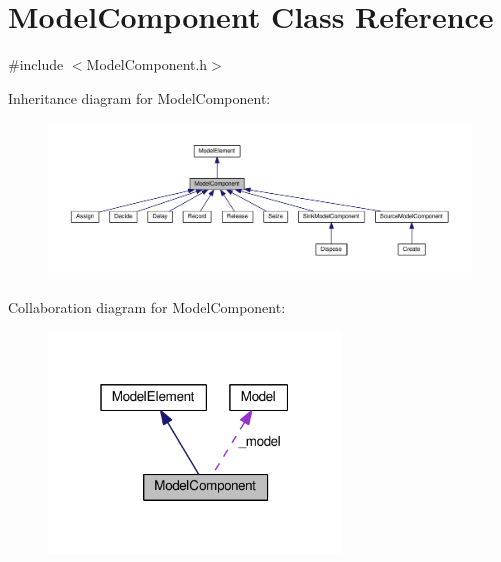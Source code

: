 \hypertarget{class_model_component}{}\section{Model\+Component Class Reference}
\label{class_model_component}


{\ttfamily \#include $<$Model\+Component.\+h$>$}



Inheritance diagram for Model\+Component\+:\nopagebreak
\begin{figure}[H]
\begin{center}
\leavevmode
\includegraphics[width=350pt]{class_model_component__inherit__graph}
\end{center}
\end{figure}


Collaboration diagram for Model\+Component\+:\nopagebreak
\begin{figure}[H]
\begin{center}
\leavevmode
\includegraphics[width=220pt]{class_model_component__coll__graph}
\end{center}
\end{figure}
